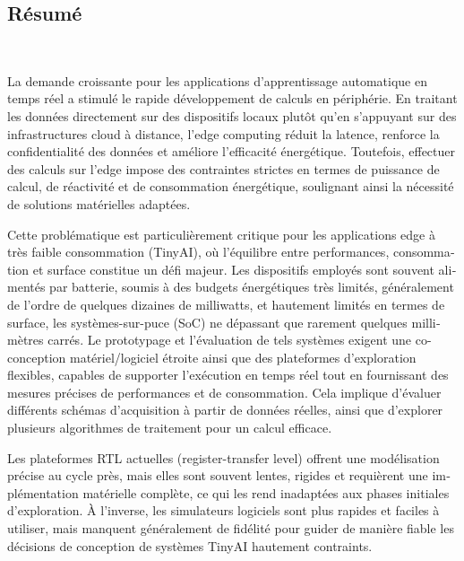 \begin{otherlanguage}{french}
\cleardoublepage
\chapter*{Résumé}
~\newline~\newline~

\setlength{\parskip}{1em}

    La demande croissante pour les applications d’apprentissage automatique en temps réel a stimulé le rapide développement de calculs en périphérie. En traitant les données directement sur des dispositifs locaux plutôt qu’en s’appuyant sur des infrastructures cloud à distance, l’edge computing réduit la latence, renforce la confidentialité des données et améliore l’efficacité énergétique. Toutefois, effectuer des calculs sur l'edge impose des contraintes strictes en termes de puissance de calcul, de réactivité et de consommation énergétique, soulignant ainsi la nécessité de solutions matérielles adaptées.

    \thispagestyle{plain}
    Cette problématique est particulièrement critique pour les applications edge à très faible consommation (\mbox{TinyAI}), où l’équilibre entre performances, consommation et surface constitue un défi majeur. Les dispositifs employés sont souvent alimentés par batterie, soumis à des budgets énergétiques très limités, généralement de l’ordre de quelques dizaines de milliwatts, et hautement limités en termes de surface, les systèmes-sur-puce (SoC) ne dépassant que rarement quelques millimètres carrés. Le prototypage et l’évaluation de tels systèmes exigent une co-conception matériel/logiciel étroite ainsi que des plateformes d’exploration flexibles, capables de supporter l’exécution en temps réel tout en fournissant des mesures précises de performances et de consommation. Cela implique d’évaluer différents schémas d’acquisition à partir de données réelles, ainsi que d’explorer plusieurs algorithmes de traitement pour un calcul efficace.
    
    Les plateformes RTL actuelles (register-transfer level) offrent une modélisation précise au cycle près, mais elles sont souvent lentes, rigides et requièrent une implémentation matérielle complète, ce qui les rend inadaptées aux phases initiales d’exploration. À l’inverse, les simulateurs logiciels sont plus rapides et faciles à utiliser, mais manquent généralement de fidélité pour guider de manière fiable les décisions de conception de systèmes \mbox{TinyAI} hautement contraints.
    

\end{otherlanguage}
